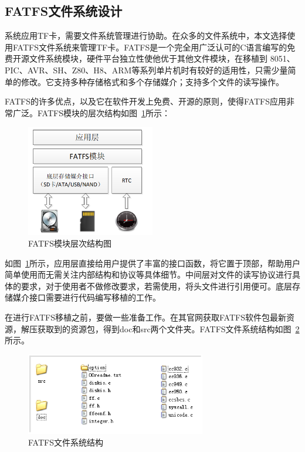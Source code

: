 \subsection{FATFS文件系统设计}
系统应用TF卡，需要文件系统管理进行协助。在众多的文件系统中，本文选择使用FATFS文件系统来管理TF卡。FATFS是一个完全用广泛认可的C语言编写的免费开源文件系统模块，硬件平台独立性使他优于其他文件模块，在移植到 8051、PIC、AVR、SH、Z80、H8、ARM等系列单片机时有较好的适用性，只需少量简单的修改。它支持多种存储格式和多个存储媒介；支持多个文件的读写操作。

FATFS的许多优点，以及它在软件开发上免费、开源的原则，使得FATFS应用非常广泛。FATFS模块的层次结构如图~\ref{fig:FATFS模块层次结构图}所示：

\begin{figure}[ht]
    \centering
	\includegraphics[width=0.5\textwidth]{fig/FATFS模块层次结构图.png}
	\caption{FATFS模块层次结构图}
	\label{fig:FATFS模块层次结构图}
\end{figure}

如图~\ref{fig:FATFS模块层次结构图}所示，应用层直接给用户提供了丰富的接口函数，将它置于顶部，帮助用户简单使用而无需关注内部结构和协议等具体细节。中间层对文件的读写协议进行具体的要求，对于使用者不做修改要求，若需使用，将头文件进行引用便可。底层存储媒介接口需要进行代码编写移植的工作。

在进行FATFS移植之前，要做一些准备工作。在其官网获取FATFS软件包最新资源，解压获取到的资源包，得到doc和src两个文件夹。FATFS文件系统结构如图~\ref{fig:FATFS文件系统结构}所示。

\begin{figure}[ht]
    \centering
	\includegraphics[width=0.7\textwidth]{fig/FATFS文件系统结构.png}
	\caption{FATFS文件系统结构}
	\label{fig:FATFS文件系统结构}
\end{figure}

